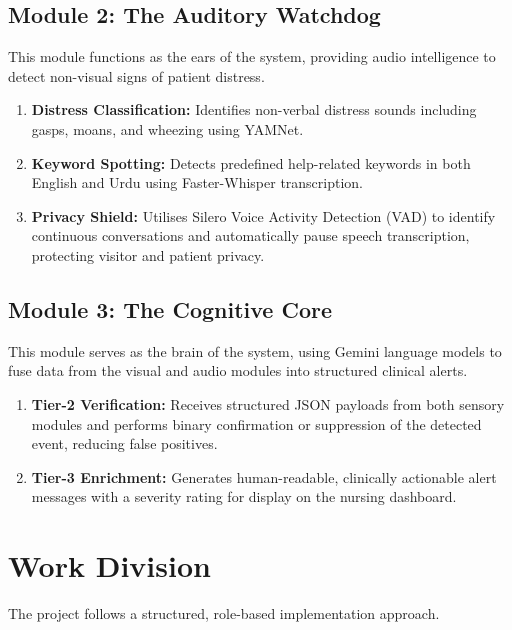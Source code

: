 \subsection{Module 2: The Auditory Watchdog}

This module functions as the ears of the system, providing audio intelligence
to detect non-visual signs of patient distress.

\begin{enumerate}
    \item \textbf{Distress Classification:} Identifies non-verbal distress sounds
    including gasps, moans, and wheezing using YAMNet.
    \item \textbf{Keyword Spotting:} Detects predefined help-related keywords in
    both English and Urdu using Faster-Whisper transcription.
    \item \textbf{Privacy Shield:} Utilises Silero Voice Activity Detection (VAD)
    to identify continuous conversations and automatically pause speech
    transcription, protecting visitor and patient privacy.
\end{enumerate}

\subsection{Module 3: The Cognitive Core}

This module serves as the brain of the system, using Gemini language models to
fuse data from the visual and audio modules into structured clinical alerts.

\begin{enumerate}
    \item \textbf{Tier-2 Verification:} Receives structured JSON payloads from
    both sensory modules and performs binary confirmation or suppression of the
    detected event, reducing false positives.
    \item \textbf{Tier-3 Enrichment:} Generates human-readable, clinically
    actionable alert messages with a severity rating for display on the nursing
    dashboard.
\end{enumerate}

\section{Work Division}
\label{sec:work_division}

The project follows a structured, role-based implementation approach.

